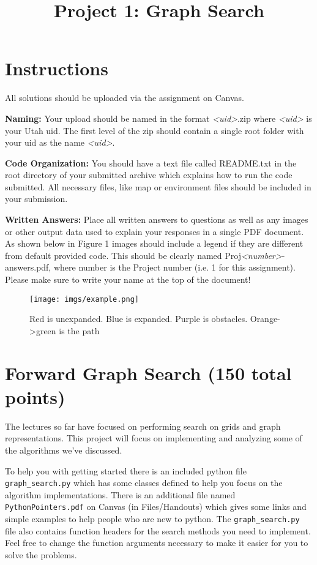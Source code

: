 \documentclass[11pt]{hermans-hw}
\institute{University of Utah}
\title{Project 1: Graph Search}
\begin{document}
\maketitle
\vspace{-30pt}
\section*{Instructions}
All solutions should be uploaded via the assignment on Canvas.

\textbf{Naming:} Your upload should be named in the format \emph{<uid>}.zip where \emph{<uid>} is your Utah uid. The first level of the zip should contain a single root folder with your uid as the name \emph{<uid>}.

\textbf{Code Organization:} You should have a text file called README.txt in the root directory of your submitted archive which explains how to run the code submitted. All necessary files, like map or environment files should be included in your submission.

\textbf{Written Answers:} Place all written answers  to questions as well as any images or other output data used to explain your responses in a single PDF document. As shown below in Figure 1 images should include a legend if they are different from default provided code. This should be clearly named Proj\emph{<number>}-answers.pdf, where number is the Project number (i.e. 1 for this assignment). Please make sure to write your name at the top of the document!
\begin{figure*}[h!]
		\texttt{[image: imgs/example.png]}
		\caption{Red is unexpanded. Blue is expanded. Purple is obstacles. Orange->green is the path}
\end{figure*} 


\section*{Forward Graph Search (150 total points)}
The lectures so far have focused on performing search on grids and graph representations. This project will focus on implementing and analyzing some of the algorithms we've discussed.

To help you with getting started there is an included python file \texttt{graph\_search.py} which has some classes defined to help you focus on the algorithm implementations.
There is an additional file named \texttt{PythonPointers.pdf} on Canvas (in Files/Handouts) which gives some links and simple examples to help people who are new to python.
The \texttt{graph\_search.py} file also contains function headers for the search methods you need to implement. Feel free to change the function arguments necessary to make it easier for you to solve the problems.
\end{document}
